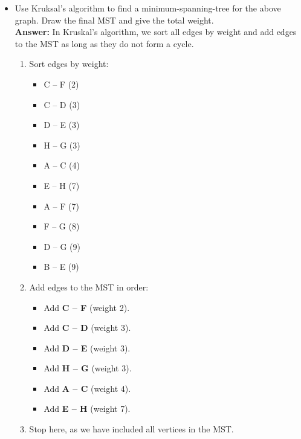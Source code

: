 \documentclass[12pt]{article}
\theoremstyle{plain}
\begin{document}
\begin{itemize}
    
    \item[(b)] Use Kruksal's algorithm to find a minimum-spanning-tree for the above graph. Draw the final MST and give the total weight. \\
    \textbf{Answer: }In Kruskal's algorithm, we sort all edges by weight and add edges to the MST as long as they do not form a cycle.
    
    \begin{enumerate}
        \item Sort edges by weight:
            \begin{itemize}
                \item C -- F (2)
                \item C -- D (3)
                \item D -- E (3)
                \item H -- G (3)
                \item A -- C (4)
                \item E -- H (7)
                \item A -- F (7)
                \item F -- G (8)
                \item D -- G (9)
                \item B -- E (9)
            \end{itemize}
        \item Add edges to the MST in order:
            \begin{itemize}
                \item Add \textbf{C -- F} (weight 2).
                \item Add \textbf{C -- D} (weight 3).
                \item Add \textbf{D -- E} (weight 3).
                \item Add \textbf{H -- G} (weight 3).
                \item Add \textbf{A -- C} (weight 4).
                \item Add \textbf{E -- H} (weight 7).
            \end{itemize}
        \item Stop here, as we have included all vertices in the MST.
    \end{enumerate}
    

\end{itemize}
\end{document}
